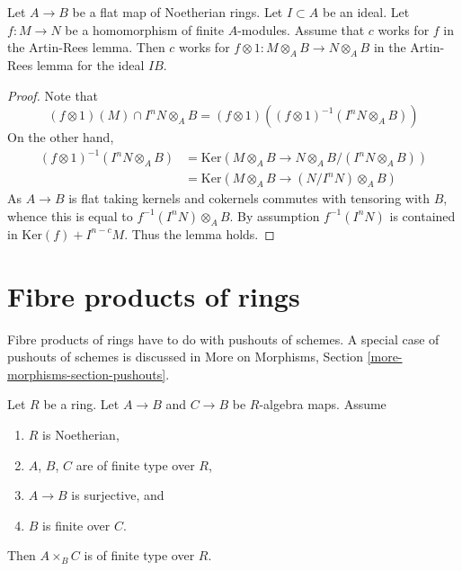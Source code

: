 \begin{lemma}
\label{lemma-works-flat-extension}
Let $A \to B$ be a flat map of Noetherian rings. Let $I \subset A$ be
an ideal. Let $f : M \to N$ be a homomorphism of finite $A$-modules.
Assume that $c$ works for $f$ in the Artin-Rees lemma. Then $c$ works for
$f \otimes 1 : M \otimes_A B \to N \otimes_A B$ in the Artin-Rees lemma
for the ideal $IB$.
\end{lemma}

\begin{proof}
Note that
$$
(f \otimes 1)(M) \cap I^n N \otimes_A B
= (f \otimes 1)\left((f \otimes 1)^{-1}(I^n N \otimes_A B)\right)
$$
On the other hand,
\begin{align*}
(f \otimes 1)^{-1}(I^n N \otimes_A B) &
= \text{Ker}(M \otimes_A B \to N \otimes_A B/(I^n N \otimes_A B)) \\
& =
\text{Ker}(M \otimes_A B \to (N/I^nN) \otimes_A B)
\end{align*}
As $A \to B$ is flat taking kernels and cokernels commutes with
tensoring with $B$, whence this is equal to
$f^{-1}(I^nN) \otimes_A B$. By assumption $f^{-1}(I^nN)$ is contained in
$\text{Ker}(f) + I^{n - c}M$. Thus the lemma holds.
\end{proof}








\section{Fibre products of rings}
\label{section-fibre-products-rings}

\noindent
Fibre products of rings have to do with pushouts of schemes. A special
case of pushouts of schemes is discussed in
More on Morphisms, Section \ref{more-morphisms-section-pushouts}.

\begin{lemma}
\label{lemma-fibre-product-finite-type}
Let $R$ be a ring. Let $A \to B$ and $C \to B$ be $R$-algebra maps.
Assume
\begin{enumerate}
\item $R$ is Noetherian,
\item $A$, $B$, $C$ are of finite type over $R$,
\item $A \to B$ is surjective, and
\item $B$ is finite over $C$.
\end{enumerate}
Then $A \times_B C$ is of finite type over $R$.
\end{lemma}

